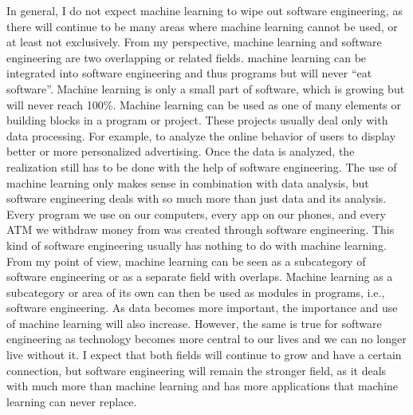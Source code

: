 \documentclass[11pt,a4paper]{article}
\begin{document}
In general, I do not expect machine learning to wipe out software engineering, as there will continue to be many areas where machine learning cannot be used, or at least not exclusively. From my perspective, machine learning and software engineering are two overlapping or related fields. machine learning can be integrated into software engineering and thus programs but will never \textquotedblleft eat software\textquotedblright. Machine learning is only a small part of software, which is growing but will never reach 100\%. Machine learning can be used as one of many elements or building blocks in a program or project. These projects usually deal only with data processing. For example, to analyze the online behavior of users to display better or more personalized advertising. Once the data is analyzed, the realization still has to be done with the help of software engineering. The use of machine learning only makes sense in combination with data analysis, but software engineering deals with so much more than just data and its analysis. Every program we use on our computers, every app on our phones, and every ATM we withdraw money from was created through software engineering. This kind of software engineering usually has nothing to do with machine learning.\\

From my point of view, machine learning can be seen as a subcategory of software engineering or as a separate field with overlaps. Machine learning as a subcategory or area of its own can then be used as modules in programs, i.e., software engineering. As data becomes more important, the importance and use of machine learning will also increase. However, the same is true for software engineering as technology becomes more central to our lives and we can no longer live without it. I expect that both fields will continue to grow and have a certain connection, but software engineering will remain the stronger field, as it deals with much more than machine learning and has more applications that machine learning can never replace.\\
\end{document}
